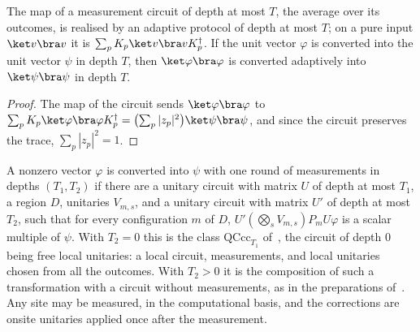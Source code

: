 \begin{theorem}
    \label{thm:measurement_adaptive}
    \leanok
    The map of a measurement circuit of depth at most $T$, the average over its outcomes, is
    realised by an adaptive protocol of depth at most $T$; on a pure input $\ket v\bra v$ it is
    $\sum_pK_p\ket v\bra vK_p^\dagger$. If the unit vector $\varphi$ is converted into the unit vector $\psi$ in depth $T$, then
    $\ket\varphi\bra\varphi$ is converted adaptively into $\ket\psi\bra\psi$ in depth $T$.
\end{theorem}
\begin{proof}
    \leanok
    The map of the circuit sends $\ket\varphi\bra\varphi$ to
    $\sum_pK_p\ket\varphi\bra\varphi K_p^\dagger=\bigl(\sum_p|z_p|^2\bigr)\ket\psi\bra\psi$,
    and since the circuit preserves the trace, $\sum_p|z_p|^2=1$.
\end{proof}

\begin{definition}
    \label{def:measurement_one_round}
    \leanok
    A nonzero vector $\varphi$ is converted into $\psi$ with one round of measurements in
    depths $(T_1,T_2)$ if there are a unitary circuit with matrix $U$ of depth at most $T_1$, a
    region $D$, unitaries $V_{m,s}$, and a unitary circuit with matrix $U'$ of depth at most
    $T_2$, such that for every configuration $m$ of $D$,
    $U'(\bigotimes_sV_{m,s})P_mU\varphi$ is a scalar multiple of $\psi$. With $T_2=0$ this is
    the class $\mathrm{QCcc}_{T_1}$ of~\cite{Piroli2021LOCC}, the circuit of depth $0$ being
    free local unitaries: a local circuit, measurements, and local unitaries chosen from all the
    outcomes. With $T_2>0$ it is the composition of such a transformation with a circuit
    without measurements, as in the preparations of~\cite{Malz2024Preparation}. Any site may be
    measured, in the computational basis, and the corrections are onsite unitaries applied
    once after the measurement.
\end{definition}

